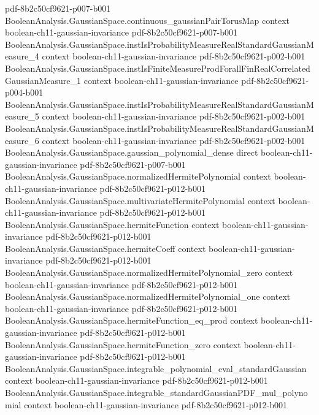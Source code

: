 \begin{lemma}
  {pdf-8b2c50cf9621-p007-b001}
\proofstep
  {BooleanAnalysis.GaussianSpace.continuous_gaussianPairTorusMap}
  {context}
  {boolean-ch11-gaussian-invariance}
  {pdf-8b2c50cf9621-p007-b001}
\proofstep
  {BooleanAnalysis.GaussianSpace.instIsProbabilityMeasureRealStandardGaussianMeasure_4}
  {context}
  {boolean-ch11-gaussian-invariance}
  {pdf-8b2c50cf9621-p002-b001}
\proofstep
  {BooleanAnalysis.GaussianSpace.instIsFiniteMeasureProdForallFinRealCorrelatedGaussianMeasure_1}
  {context}
  {boolean-ch11-gaussian-invariance}
  {pdf-8b2c50cf9621-p004-b001}
\proofstep
  {BooleanAnalysis.GaussianSpace.instIsProbabilityMeasureRealStandardGaussianMeasure_5}
  {context}
  {boolean-ch11-gaussian-invariance}
  {pdf-8b2c50cf9621-p002-b001}
\proofstep
  {BooleanAnalysis.GaussianSpace.instIsProbabilityMeasureRealStandardGaussianMeasure_6}
  {context}
  {boolean-ch11-gaussian-invariance}
  {pdf-8b2c50cf9621-p002-b001}
\proofstep
  {BooleanAnalysis.GaussianSpace.gaussian_polynomial_dense}
  {direct}
  {boolean-ch11-gaussian-invariance}
  {pdf-8b2c50cf9621-p007-b001}
\proofstep
  {BooleanAnalysis.GaussianSpace.normalizedHermitePolynomial}
  {context}
  {boolean-ch11-gaussian-invariance}
  {pdf-8b2c50cf9621-p012-b001}
\proofstep
  {BooleanAnalysis.GaussianSpace.multivariateHermitePolynomial}
  {context}
  {boolean-ch11-gaussian-invariance}
  {pdf-8b2c50cf9621-p012-b001}
\proofstep
  {BooleanAnalysis.GaussianSpace.hermiteFunction}
  {context}
  {boolean-ch11-gaussian-invariance}
  {pdf-8b2c50cf9621-p012-b001}
\proofstep
  {BooleanAnalysis.GaussianSpace.hermiteCoeff}
  {context}
  {boolean-ch11-gaussian-invariance}
  {pdf-8b2c50cf9621-p012-b001}
\proofstep
  {BooleanAnalysis.GaussianSpace.normalizedHermitePolynomial_zero}
  {context}
  {boolean-ch11-gaussian-invariance}
  {pdf-8b2c50cf9621-p012-b001}
\proofstep
  {BooleanAnalysis.GaussianSpace.normalizedHermitePolynomial_one}
  {context}
  {boolean-ch11-gaussian-invariance}
  {pdf-8b2c50cf9621-p012-b001}
\proofstep
  {BooleanAnalysis.GaussianSpace.hermiteFunction_eq_prod}
  {context}
  {boolean-ch11-gaussian-invariance}
  {pdf-8b2c50cf9621-p012-b001}
\proofstep
  {BooleanAnalysis.GaussianSpace.hermiteFunction_zero}
  {context}
  {boolean-ch11-gaussian-invariance}
  {pdf-8b2c50cf9621-p012-b001}
\proofstep
  {BooleanAnalysis.GaussianSpace.integrable_polynomial_eval_standardGaussian}
  {context}
  {boolean-ch11-gaussian-invariance}
  {pdf-8b2c50cf9621-p012-b001}
\proofstep
  {BooleanAnalysis.GaussianSpace.integrable_standardGaussianPDF_mul_polynomial}
  {context}
  {boolean-ch11-gaussian-invariance}
  {pdf-8b2c50cf9621-p012-b001}

\end{lemma}

